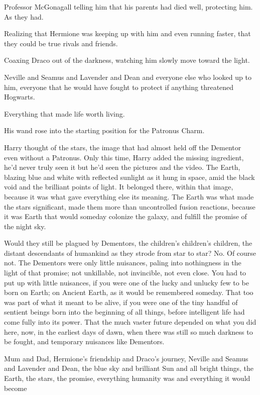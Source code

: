 Professor McGonagall telling him that his parents had died well, protecting
him. As they had.

Realizing that Hermione was keeping up with him and even running faster, that
they could be true rivals and friends.

Coaxing Draco out of the darkness, watching him slowly move toward the light.

Neville and Seamus and Lavender and Dean and everyone else who looked up to
him, everyone that he would have fought to protect if anything threatened
Hogwarts.

Everything that made life worth living.

His wand rose into the starting position for the Patronus Charm.

Harry thought of the stars, the image that had almost held off the Dementor
even without a Patronus. Only this time, Harry added the missing ingredient,
he'd never truly seen it but he'd seen the pictures and the video. The Earth,
blazing blue and white with reflected sunlight as it hung in space, amid the
black void and the brilliant points of light. It belonged there, within that
image, because it was what gave everything else its meaning. The Earth was what
made the stars significant, made them more than uncontrolled fusion reactions,
because it was Earth that would someday colonize the galaxy, and fulfill the
promise of the night sky.

Would they still be plagued by Dementors, the children's children's children,
the distant descendants of humankind as they strode from star to star? No. Of
course not. The Dementors were only little nuisances, paling into nothingness
in the light of that promise; not unkillable, not invincible, not even close.
You had to put up with little nuisances, if you were one of the lucky and
unlucky few to be born on Earth; on Ancient Earth, as it would be remembered
someday. That too was part of what it meant to be alive, if you were one of the
tiny handful of sentient beings born into the beginning of all things, before
intelligent life had come fully into its power. That the much vaster future
depended on what you did here, now, in the earliest days of dawn, when there
was still so much darkness to be fought, and temporary nuisances like Dementors.

Mum and Dad, Hermione's friendship and Draco's journey, Neville and Seamus and
Lavender and Dean, the blue sky and brilliant Sun and all bright things, the
Earth, the stars, the promise, everything humanity was and everything it would
become{\el}

